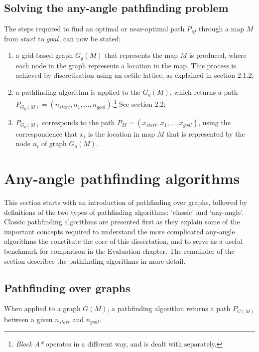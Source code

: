 \documentclass[12pt,notitlepage]{report}
\begin{document}
\subsection{Solving the any-angle pathfinding problem}

\noindent
The steps required to find an optimal or near-optimal path $P_{M}$ through a map $M$ from $start$ to $goal$, can now be stated:
\begin{enumerate}
\item a grid-based graph $G_{g}(M)$ that represents the map $M$ is produced, where each node in the graph represents a location in the map. This process is achieved by discretisation using an octile lattice, as explained in section 2.1.2;
\item a pathfinding algorithm is applied to the $G_{g}(M)$, which returns a path $P_{G_{g}(M)} = (n_{start},n_{1},...,n_{goal})$.\footnote{{\em Block A*} operates in a different way, and is dealt with separately.} See section 2.2;
\item $P_{G_{g}(M)}$ corresponds to the path $P_{M} = (x_{start},x_{1},...,x_{goal})$, using the correspondence that $x_{i}$ is the location in map $M$ that is represented by the node $n_{i}$ of graph $G_{g}(M)$.
\end{enumerate}

\section{Any-angle pathfinding algorithms}

\noindent
This section starts with an introduction of pathfinding over graphs, followed by definitions of the two types of pathfinding algorithms: `classic' and `any-angle'. Classic pathfinding algorithms are presented first as they explain some of the important concepts required to understand the more complicated any-angle algorithms the constitute the core of this dissertation, and to serve as a useful benchmark for comparison in the Evaluation chapter. The remainder of the section describes the pathfinding algorithms in more detail.
 
\subsection{Pathfinding over graphs}

When applied to a graph $G(M)$, a pathfinding algorithm returns a path $P_{G(M)}$ between a given $n_{start}$ and $n_{goal}$.\\
\end{document}

